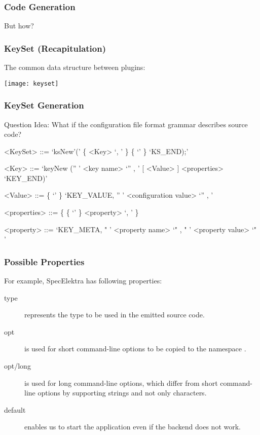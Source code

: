 
\begin{frame}
	\frametitle{Code Generation}


	\pause
	\vspace{2em}
	But how?
\end{frame}

\begin{frame}
	\frametitle{KeySet (Recapitulation)}

	The common data structure between plugins:
	\vspace{1cm}

	\texttt{[image: keyset]}
\end{frame}

\begin{frame}[fragile]
	\frametitle{KeySet Generation}
	\begin{alertblock}{Question}
	Idea: What if the configuration file format grammar describes source code?
	\end{alertblock}
	\pause

	\begin{grammar}
	<KeySet> ::= \lq ksNew'\WhiteSpace(' \{ <Key> \lq , \LineBreak'  \}  \{ \lq\WhiteSpace' \} \lq KS\_END);'

	<Key> ::= \lq keyNew \WhiteSpace ('' ' <key name> \lq ''  , \LineBreak' [ <Value> ] <properties> \lq KEY_END)'

	<Value> ::=  \{ \lq\WhiteSpace' \} \lq KEY\_VALUE, \WhiteSpace '' ' <configuration value> \lq ''  , \LineBreak'

	<properties> ::= \{ \{ \lq\WhiteSpace' \} <property> \lq , \LineBreak' \}

	<property> ::=  \lq KEY\_META, \WhiteSpace " ' <property name> \lq "  , \WhiteSpace " ' <property value> \lq " '
	\end{grammar}
\end{frame}

\begin{frame}
	\frametitle{Possible Properties}

	For example, SpecElektra has following properties:
	\begin{description}
	\item[type] represents the type to be used in the emitted source code.
	\item[opt] is used for short command-line options to be copied to the namespace .
	\item[opt/long] is used for long command-line options, which differ from short command-line options by supporting strings and not only characters.
	\item[default] enables us to start the application even if the backend does not work.
	\end{description}
\end{frame}

